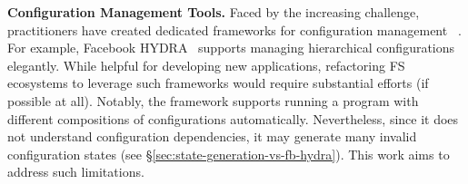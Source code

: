\smallskip
\noindent
{\bf Configuration Management Tools.} Faced by the increasing  challenge, practitioners have created dedicated frameworks for configuration management 
~\cite{CFEngine,Yadan2019Hydra}. 
For example,  
Facebook HYDRA~\cite{Yadan2019Hydra} supports managing hierarchical configurations elegantly. 
While helpful for developing new applications, refactoring FS ecosystems to leverage such frameworks would require substantial efforts (if possible at all).
Notably, the framework supports running a program with different compositions of configurations automatically. Nevertheless,  since it does not understand configuration dependencies, it may generate many invalid configuration states (see \S\ref{sec:state-generation-vs-fb-hydra}). This work aims to address such limitations.

